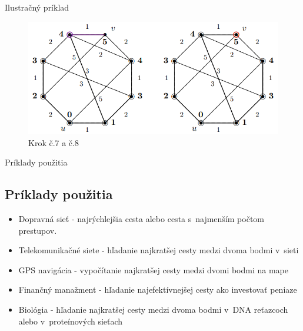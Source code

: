 \documentclass[15pt]{beamer}
\begin{document}
\begin{frame}{Ilustračný príklad}
	\begin{figure}
		\centering
		\includegraphics{imgs/dijkstra5.png}
		\caption{Krok č.7 a č.8}
		\label{fig:dijkstra5}
	\end{figure}
\end{frame}

\begin{frame}{Príklady použitia}
	\subsection{Príklady použitia}
	\begin{itemize}
		\item Dopravná sieť - najrýchlejšia cesta alebo cesta s~najmenším počtom prestupov.
		\item Telekomunikačné siete - hľadanie najkratšej cesty medzi dvoma bodmi v~sieti
		\item GPS navigácia - vypočítanie najkratšej cesty medzi dvomi bodmi na mape
		\item Finančný manažment - hľadanie najefektívnejšej cesty ako investovať peniaze
		\item Biológia - hľadanie najkratšej cesty medzi dvoma bodmi v~DNA reťazcoch alebo v~proteínových sieťach
	\end{itemize}
\end{frame}
\end{document}
